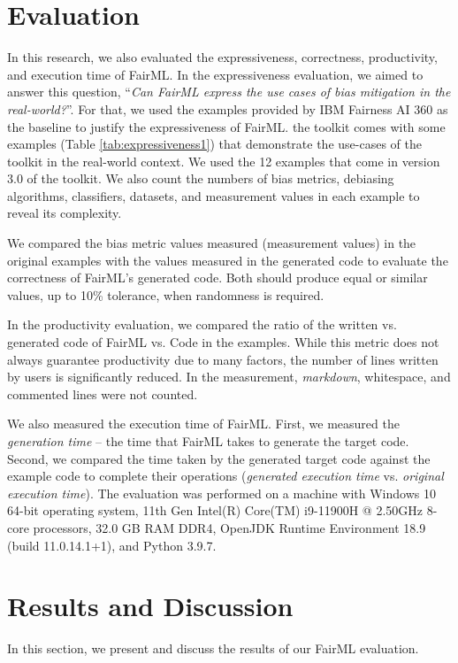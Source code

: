 \documentclass[sigconf,review]{acmart}
\begin{document}
	\section{Evaluation}
	\label{sec:evaluation}
	In this research, we also evaluated the expressiveness, correctness, productivity, and execution time of FairML. In the expressiveness evaluation, we aimed to answer this question, 
	``\textit{Can FairML express the use cases of bias mitigation in the real-world?}''. For that, we used the examples provided by IBM Fairness AI 360 as the baseline to justify the expressiveness of FairML. 
	the toolkit comes with some examples (Table \ref{tab:expressiveness1})
	that demonstrate 
	the use-cases of the toolkit in the real-world context. 
	We used the 12 examples that come in version 3.0 of the toolkit.
	We also count the numbers of bias metrics, debiasing algorithms, classifiers, datasets, and measurement values in each example to reveal its complexity. 
	
	We compared the bias metric values measured (measurement values) in the original examples with the values measured in the generated code to evaluate the correctness of FairML's generated code. Both should produce equal or similar values, up to 10\% tolerance, when randomness is required.  
	
	In the productivity evaluation, 
	we compared the ratio of the written vs. generated code of FairML vs.
	Code in the examples. 
	While this metric does not always guarantee productivity due to many factors, 
	the number of lines written by users is significantly reduced. In the measurement, \textit{markdown}, whitespace, and commented lines were not counted.
	
	We also measured the execution time of FairML. First, we measured the \textit{generation time} -- the time that FairML takes to generate the target code. Second, we compared the time taken by the generated target code against the example code to complete their operations (\textit{generated execution time} vs. \textit{original execution time}). The evaluation was performed on a machine with Windows 10 64-bit operating system, 11th Gen Intel(R) Core(TM) i9-11900H @ 2.50GHz 8-core processors, 32.0 GB RAM DDR4, OpenJDK Runtime Environment 18.9 (build 11.0.14.1+1), and Python 3.9.7.
	
	\section{Results and Discussion}
	\label{sec:result_and_discussion}
	In this section, we present and discuss the results of our FairML evaluation.
	
\end{document}
